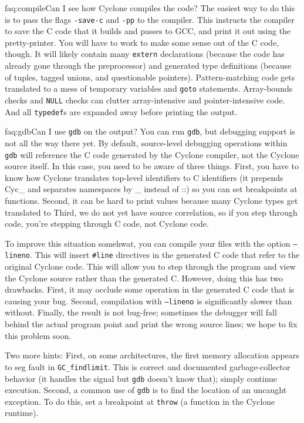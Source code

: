 \begin{faqa}{faq:compile}{Can I see how Cyclone compiles the code?}
The easiest way to do this is to pass the flags \texttt{-save-c} and
\texttt{-pp} to the compiler.  This instructs the compiler to save the
C code that it builds and passes to GCC, and print it out using the
pretty-printer.  You will have to work to make some sense out of the C
code, though.  It will likely contain many \texttt{extern}
declarations (because the code has already gone through the
preprocessor) and generated type definitions (because of tuples,
tagged unions, and questionable pointers).  Pattern-matching code gets
translated to a mess of temporary variables and \texttt{goto}
statements.  Array-bounds checks and \texttt{NULL} checks can clutter
array-intensive and pointer-intensive code.  And all \texttt{typedef}s
are expanded away before printing the output.
\end{faqa}

\begin{faqa}{faq:gdb}{Can I use \texttt{gdb} on the output?}
You can run {\tt gdb}, but debugging support is not all the way there yet.
By default, source-level debugging operations within {\tt gdb} will
reference the C code generated by the Cyclone compiler, not the Cyclone
source itself.  In this case, you need to be aware of three things.  First,
you have to know how Cyclone translates top-level identifiers to C
identifiers (it prepends Cyc_ and separates namespaces by _ instead of ::)
so you can set breakpoints at functions.  Second, it can be hard to print
values because many Cyclone types get translated to   Third,
we do not yet have source correlation, so if you step through code, you're
stepping through C code, not Cyclone code.

To improve this situation somehwat, you can compile your files with the
option \texttt{--lineno}.  This will insert \texttt{#line} directives in the
generated C code that refer to the original Cyclone code.  This will allow
you to step through the program and view the Cyclone source rather than the
generated C.  However, doing this has two drawbacks.  First, it may occlude
some operation in the generated C code that is causing your bug.  Second,
compilation with \texttt{--lineno} is significantly slower than without.
Finally, the result is not bug-free; sometimes the debugger will fall behind
the actual program point and print the wrong source lines; we hope to fix
this problem soon.

Two more hints: First, on some architectures, the first memory
allocation appears to seg fault in \texttt{GC_findlimit}.  This is
correct and documented garbage-collector behavior (it handles the
signal but \texttt{gdb} doesn't know that); simply continue execution.
Second, a common use of \texttt{gdb} is to find the location of an
uncaught exception.  To do this, set a breakpoint at \texttt{throw} (a
function in the Cyclone runtime).
\end{faqa}

